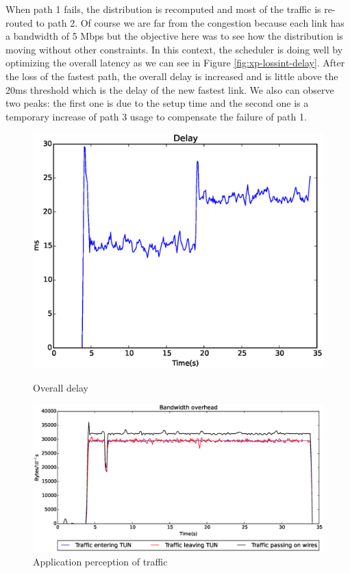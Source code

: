When path 1 fails, the distribution is recomputed and most of the traffic is re-routed to path 2. Of course we are far from the congestion because each link has a bandwidth of 5 Mbps but the objective here was to see how the distribution is moving without other constraints. In this context, the scheduler is doing well by optimizing the overall latency as we can see in Figure \ref{fig:xp-lossint-delay}. After the loss of the fastest path, the overall delay is increased and is little above the  20ms threshold which is the delay of the new fastest link. We also can observe two peaks: the first one is due to the setup time and the second one is a temporary increase of path 3 usage to compensate the failure of path 1.



\begin{figure}[!ht]
\centering
\begin{minipage}{0.4\linewidth}
\includegraphics[width=\textwidth]{images/xp/intlost_delay.eps}
\caption{Overall delay}
\label{fig:xp-lossint-delay}
\end{minipage}
\begin{minipage}{0.59\linewidth}
\includegraphics[width=\textwidth]{images/xp/intlost_tun.eps}
\caption{Application perception of traffic}
\label{fig:xp-lossint-tun}
\end{minipage}
\end{figure}

